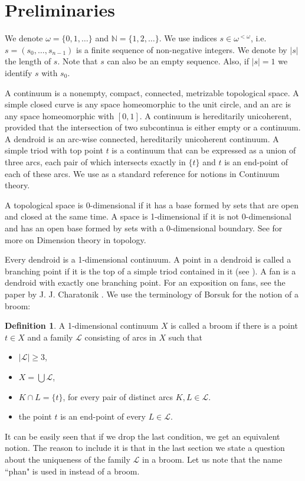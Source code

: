 \documentclass[12pt]{article}
\theoremstyle{definition}
\newtheorem{definition}[theorem]{Definition}
\theoremstyle{remark}
\begin{document}
\section{Preliminaries}

We denote $\omega=\{0, 1,\dots\}$ and $\mathbb N=\{1, 2,\dots\}$.
We use indices $s\in \omega^{<\omega}$, i.e. $s=(s_0,\dots, s_{n-1})$ is a finite sequence of non-negative integers. We denote by $|s|$ the length of $s$. Note that $s$ can also be an empty sequence. Also, if $|s|=1$ we identify $s$ with $s_0$.

A continuum is a nonempty, compact, connected, metrizable topological space. A simple closed curve is any space homeomorphic to the unit circle, and an arc is any space homeomorphic with $[0,1]$. A continuum is hereditarily unicoherent, provided that the intersection of two subcontinua is either empty or a continuum.
A dendroid is an arc-wise connected, hereditarily unicoherent continuum. A simple triod with top point $t$ is a continuum that can be expressed as a union of three arcs, each pair of which intersects exactly in $\{t\}$ and $t$ is an end-point of each of these arcs.  We use \cite{Nadler} as a standard reference for notions in Continuum theory.

A topological space is 0-dimensional if it has a base formed by sets that are open and closed at the same time. A space is 1-dimensional if it is not 0-dimensional and has an open base formed by sets with a 0-dimensional boundary. See \cite{EngelkingDim} for more on Dimension theory in topology.

Every dendroid is a 1-dimensional continuum. A point in a dendroid is called a branching point if it is the top of a simple triod contained in it (see \cite{CharatonikDednroids}). A fan is a dendroid with exactly one branching point.
For an exposition on fans, see the paper by J. J. Charatonik \cite{CharatonikOnFans}.
We use the terminology of Borsuk for the notion of a broom:

\begin{definition}
A 1-dimensional continuum $X$ is called a broom if there is a point $t\in X$ and a family $\mathcal L$ consisting of arcs in $X$ such that 
\begin{itemize}[noitemsep]
\item $|\mathcal L|\geq 3$,
\item $X=\bigcup\mathcal L$,
\item $K\cap L=\{t\}$, for every pair of distinct arcs $K, L\in \mathcal L$.
\item the point $t$ is an end-point of every $L\in\mathcal L$.
\end{itemize}
\end{definition}
It can be easily seen that if we drop the last condition, we get an equivalent notion.
The reason to include it is that in the last section we state a question about the uniqueness of the family $\mathcal L$ in a broom.
Let us note that the name “phan" is used in \cite{phans} instead of a broom.
\end{document}
